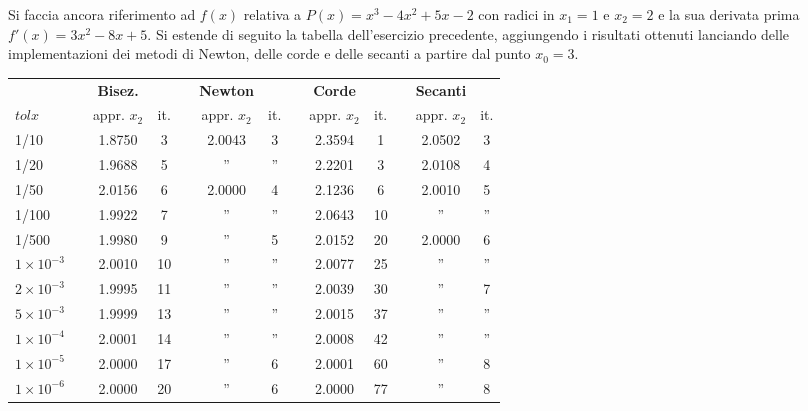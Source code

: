 \begin{center}
\footnotesize\noindent{}\end{center}

Si faccia ancora riferimento ad \(f(x)\) relativa a \(P(x)=x^3 - 4x^2 + 5x - 2\) con radici in \(x_1=1\) e \(x_2=2\) e la sua derivata prima \(f'(x) = 3x^2 - 8x + 5\). Si estende di seguito la tabella dell'esercizio precedente, aggiungendo i risultati ottenuti lanciando delle implementazioni dei metodi di Newton, delle corde e delle secanti a partire dal punto \(x_0 = 3\).

\begin{tabular}{l*{12}{c}}
 & \vline& \textbf{Bisez.} & & \vline& \textbf{Newton} & & \vline& \textbf{Corde} & & \vline& \textbf{Secanti} \\
 \(tolx\) & \vline& appr. \(x_2\) & it. & \vline& appr. \(x_2\) & it.& \vline& appr. \(x_2\) & it.& \vline& appr. \(x_2\) & it.\\
\hline
 1/10 & \vline& 1.8750 & 3 & \vline& 2.0043 & 3 & \vline& 2.3594 & 1 & \vline& 2.0502 & 3\\
 1/20 & \vline& 1.9688 & 5 & \vline& '' & ''& \vline& 2.2201 & 3 & \vline& 2.0108 & 4\\
 1/50 & \vline& 2.0156 & 6 & \vline& 2.0000 & 4 & \vline& 2.1236 & 6 & \vline& 2.0010 & 5\\
 1/100 & \vline& 1.9922 & 7 & \vline& '' &'' & \vline& 2.0643 & 10 & \vline& '' & ''\\
 1/500 & \vline& 1.9980 & 9 & \vline& '' & 5 & \vline& 2.0152 & 20 & \vline& 2.0000 & 6\\
 \(1 \times 10^{-3}\) & \vline& 2.0010 & 10 & \vline& '' & '' & \vline& 2.0077 & 25 & \vline& '' & ''\\
 \(2 \times 10^{-3}\) & \vline& 1.9995 & 11 & \vline& '' & '' & \vline& 2.0039 & 30 & \vline& '' & 7\\
 \(5 \times 10^{-3}\) & \vline& 1.9999 & 13 & \vline& '' & '' & \vline& 2.0015 & 37 & \vline& '' & ''\\
 \(1 \times 10^{-4}\) & \vline& 2.0001 & 14 & \vline& '' & '' & \vline& 2.0008 & 42 & \vline& '' & ''\\
 \(1 \times 10^{-5}\) & \vline& 2.0000 & 17 & \vline& '' & 6  & \vline& 2.0001 & 60 & \vline& '' & 8\\
 \(1 \times 10^{-6}\) & \vline& 2.0000 & 20 & \vline& '' & 6  & \vline& 2.0000 & 77 & \vline& '' & 8\\
\end{tabular} \\

